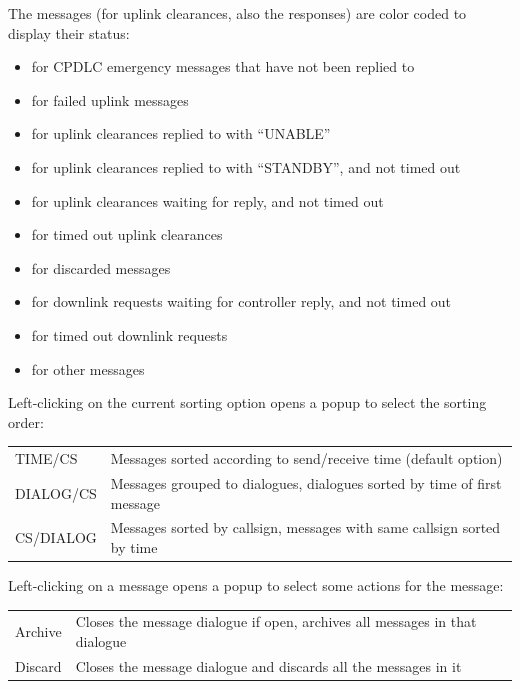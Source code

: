 \documentclass[a4paper,oneside,11pt]{memoir}
\begin{document}
\bigskip

The messages (for uplink clearances, also the responses) are color coded to display their status:

\begin{itemize}
    \item {} for CPDLC emergency messages that have not been replied to
    \item {} for failed uplink messages
    \item {} for uplink clearances replied to with “UNABLE”
    \item {} for uplink clearances replied to with “STANDBY”, and not timed out
    \item {} for uplink clearances waiting for reply, and not timed out
    \item {} for timed out uplink clearances
    \item {} for discarded messages
    \item {} for downlink requests waiting for controller reply, and not timed out
    \item {} for timed out downlink requests
    \item {} for other messages
\end{itemize}

\bigskip

Left-clicking on the current sorting option opens a popup to select the sorting order:

\begin{longtable}{p{2.5cm} p{10cm}}
    TIME/CS     & Messages sorted according to send/receive time (default option)\\
    DIALOG/CS   & Messages grouped to dialogues, dialogues sorted by time of first message\\
    CS/DIALOG   & Messages sorted by callsign, messages with same callsign sorted by time\\
\end{longtable}

\bigskip

Left-clicking on a message opens a popup to select some actions for the message:

\begin{longtable}{p{2.5cm} p{10cm}}
    Archive & Closes the message dialogue if open, archives all messages in that dialogue\\
    Discard & Closes the message dialogue and discards all the messages in it\\
\end{longtable}
\end{document}
